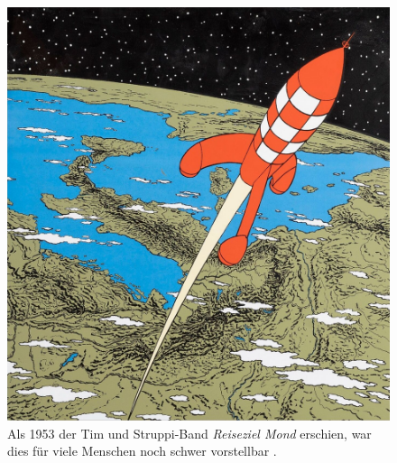 \begin{figure}
\centering
\includegraphics[width=1.0\linewidth]{papers/leo/Grafiken/raketen_typen-cropped.jpg}
\caption{Als 1953 der Tim und Struppi-Band {\em Reiseziel Mond}
erschien, war dies für viele Menschen noch schwer vorstellbar
\cite{leo:timstruppi}.
%
}
\label{fig:leo:raketen_typen}
\end{figure}







